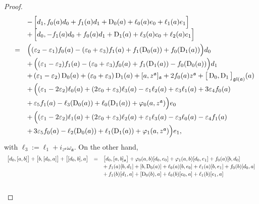\documentclass[10pt,a4paper]{amsart}
\newcommand{\D}{\operatorname{D}}
\newcommand{\ai}{\mathfrak{a}}
\newcommand{\gl}{\mathfrak{gl}}
\newcommand{\w}{\omega}
\begin{document}
\begin{proof}
\begin{equation*}
\begin{array}{r c l}
&&-\,\Big[d_1,f_0(a)d_0+f_1(a)d_1+\D_0(a)+\ell_0(a)e_0+\ell_1(a)e_1\Big]\\\vspace{1.5mm}
&&+\,\Big[d_0,-f_1(a)d_0+f_0(a)d_1+\D_1(a)+\ell_3(a)e_0+\ell_2(a)e_1\Big]\\\vspace{0.75mm}
&=&\Big( (\varepsilon_2-\varepsilon_1)f_0(a)-(\varepsilon_0+\varepsilon_3)f_1(a)+f_1(\D_0(a))+f_0(\D_1(a))\Big)d_0\\\vspace{0.75mm}
&&+\,\Big( (\varepsilon_1-\varepsilon_2)f_1(a)-(\varepsilon_0+\varepsilon_3)f_0(a)+f_1(\D_1(a))-f_0(\D_0(a))\Big)d_1\\\vspace{0.75mm}
&&+\,(\varepsilon_1-\varepsilon_2)\D_0(a)+(\varepsilon_0+\varepsilon_3)\D_1(a)+[a,z^\ai]_\ai+2f_0(a)z^\ai+\big[\D_0,\D_1\big]_{\gl(\ai)}(a)\\\vspace{0.75mm}
&&+\,\Big((\varepsilon_1-2\varepsilon_2)\ell_0(a)+(2\varepsilon_0+\varepsilon_3)\ell_3(a)-\varepsilon_1\ell_2(a)+\varepsilon_3\ell_1(a)+3\varepsilon_4f_0(a)\\\vspace{0.75mm}
&&+\,\varepsilon_5f_1(a)-\ell_3(\D_0(a))+\ell_0(\D_1(a))+\varphi_0(a,z^\ai)\Big)e_0\\\vspace{0.75mm}
&&+\,\Big((\varepsilon_1-2\varepsilon_2)\ell_1(a)+(2\varepsilon_0+\varepsilon_3)\ell_2(a)+\varepsilon_1\ell_3(a)-\varepsilon_3\ell_0(a)-\varepsilon_4f_1(a)\\
&&+\,3\varepsilon_5f_0(a)-\ell_2(\D_0(a))+\ell_1(\D_1(a))+\varphi_1(a,z^\ai)\Big)e_1,
	\end{array}
	\end{equation*}
with $\ell_3:=\ell_1+i_{z^\ai}\w_\ai$. On the other hand,
	\begin{equation*}
		\begin{array}{r c l}\vspace{0.75mm}
\big[d_0,[a,b]\big]+\big[b,[d_0,a]\big]+\big[[d_0,b],a\big]&=&\big[d_0,[a,b]_\ai\big]+\varphi_0(a,b)[d_0,e_0]+\varphi_1(a,b)[d_0,e_1]+f_0(a)[b,d_0]\\\vspace{0.75mm}
&&+\,f_1(a)[b,d_1]+[b,\D_0(a)]+\ell_0(a)[b,e_0]+\ell_1(a)[b,e_1]+f_0(b)[d_0,a]\\\vspace{1.5mm}
		&&+\,f_1(b)[d_1,a]+[\D_0(b),a]+\ell_0(b)[e_0,a]+\ell_1(b)[e_1,a]\\\vspace{0.75mm}

\end{array}
\end{equation*}
\end{proof}
\end{document}

